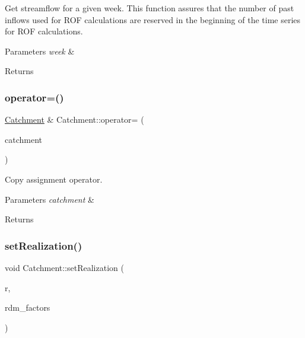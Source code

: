 Get streamflow for a given week. This function assures that the number of past inflows used for R\+OF calculations are reserved in the beginning of the time series for R\+OF calculations. 
\begin{DoxyParams}{Parameters}
{\em week} & \\
\hline
\end{DoxyParams}
\begin{DoxyReturn}{Returns}

\end{DoxyReturn}
\mbox{\label{classCatchment_a66d0f20f34893ea2df589e5cbce31fc4_a66d0f20f34893ea2df589e5cbce31fc4}} 
\subsubsection{\texorpdfstring{operator=()}{operator=()}}
{\footnotesize\ttfamily \mbox{\hyperlink{classCatchment}{Catchment}} \& Catchment\+::operator= (\begin{DoxyParamCaption}\item[{const \mbox{\hyperlink{classCatchment}{Catchment}} \&}]{catchment }\end{DoxyParamCaption})\hspace{0.3cm}{\ttfamily [default]}}

Copy assignment operator. 
\begin{DoxyParams}{Parameters}
{\em catchment} & \\
\hline
\end{DoxyParams}
\begin{DoxyReturn}{Returns}

\end{DoxyReturn}
\mbox{\label{classCatchment_affb9042c5854a76efd864ce87d7d1877_affb9042c5854a76efd864ce87d7d1877}} 
\subsubsection{\texorpdfstring{set\+Realization()}{setRealization()}}
{\footnotesize\ttfamily void Catchment\+::set\+Realization (\begin{DoxyParamCaption}\item[{unsigned long}]{r,  }\item[{vector$<$ double $>$ \&}]{rdm\+\_\+factors }\end{DoxyParamCaption})\hspace{0.3cm}{\ttfamily [virtual]}}


